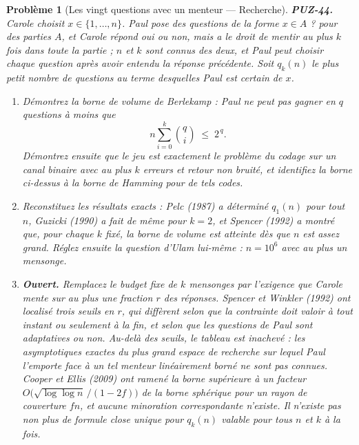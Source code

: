 \documentclass[11pt]{article}
\newtheorem{problem}{Problème}
\begin{document}
\begin{problem}[{Les vingt questions avec un menteur --- Recherche}]
\textbf{PUZ-44.} Carole choisit $ x \in \{1, \ldots, n\} $. Paul pose des questions de
la forme \og{} $ x \in A $ ? \fg{} pour des parties $ A $, et Carole répond oui ou non, mais a le
droit de mentir au plus $ k $ fois dans toute la partie ; $ n $ et $ k $ sont connus des
deux, et Paul peut choisir chaque question après avoir entendu la réponse précédente. Soit
$ q_k(n) $ le plus petit nombre de questions au terme desquelles Paul est certain de
$ x $.
\begin{enumerate}
\item[(a)] Démontrez la borne de volume de Berlekamp : Paul ne peut pas gagner en $ q $ questions
à moins que
\[ n \sum_{i=0}^{k} \binom{q}{i} \;\le\; 2^{\,q}. \]
Démontrez ensuite que le jeu est exactement le problème du codage sur un canal binaire avec
au plus $ k $ erreurs et retour non bruité, et identifiez la borne ci-dessus à la borne de
Hamming pour de tels codes.
\item[(b)] Reconstituez les résultats exacts : Pelc (1987) a déterminé $ q_1(n) $ pour tout
$ n $, Guzicki (1990) a fait de même pour $ k = 2 $, et Spencer (1992) a montré que, pour
chaque $ k $ fixé, la borne de volume est atteinte dès que $ n $ est assez grand.
Réglez ensuite la question d'Ulam lui-même : $ n = 10^{6} $ avec au plus un mensonge.
\item[(c)] \textbf{Ouvert.} Remplacez le budget fixe de $ k $ mensonges par l'exigence que Carole
mente sur au plus une fraction $ r $ des réponses. Spencer et Winkler (1992) ont localisé
trois seuils en $ r $, qui diffèrent selon que la contrainte doit valoir à tout instant ou
seulement à la fin, et selon que les questions de Paul sont adaptatives ou non. Au-delà des
seuils, le tableau est inachevé : les asymptotiques exactes du plus grand espace de recherche
sur lequel Paul l'emporte face à un tel menteur linéairement borné ne sont pas connues.
Cooper et Ellis (2009) ont ramené la borne supérieure à un facteur
$ O\!\big(\sqrt{\log\log n}\,/(1-2f)\big) $ de la borne sphérique pour un rayon de
couverture $ fn $, et aucune minoration correspondante n'existe. Il n'existe pas non plus de
formule close unique pour $ q_k(n) $ valable pour tous $ n $ et $ k $ à la fois.
\end{enumerate}

\end{problem}
\end{document}
